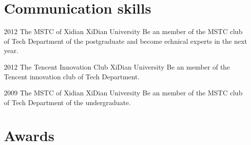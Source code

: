 \documentclass[]{friggeri-cv} %
\begin{document}
\section{Communication skills}

\begin{entrylist}
\entry
{2012}
{The MSTC of Xidian}
{XiDian University}
{Be an member of the MSTC club of Tech Department of the postgraduate and become echnical experts in the next year.}

\entry
{2012}
{The Tencent Innovation Club}
{XiDian University}
{Be an member of the Tencent innovation club of Tech Department.}

\entry
{2009}
{The MSTC of Xidian}
{XiDian University}
{Be an member of the MSTC club of Tech Department of the undergraduate.}

\end{entrylist}



\section{Awards}
\end{document}
